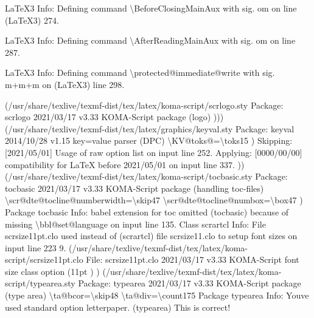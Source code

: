 \documentclass[
  letterpaper,
  DIV=11,
  numbers=noendperiod]{scrartcl}
\newenvironment{Shaded}{\begin{snugshade}}{\end{snugshade}}
\newcommand{\NormalTok}[1]{\textcolor[rgb]{0.00,0.23,0.31}{#1}}
\begin{document}
\begin{Shaded}
\begin{Highlighting}[]
\NormalTok{LaTeX3 Info: Defining command \textbackslash{}BeforeClosingMainAux with sig. \textquotesingle{}om\textquotesingle{} on line}
\NormalTok{(LaTeX3)     274.}


\NormalTok{LaTeX3 Info: Defining command \textbackslash{}AfterReadingMainAux with sig. \textquotesingle{}om\textquotesingle{} on line 287.}


\NormalTok{LaTeX3 Info: Defining command \textbackslash{}protected@immediate@write with sig. \textquotesingle{}m+m+m\textquotesingle{} on}
\NormalTok{(LaTeX3)     line 298.}

\NormalTok{(/usr/share/texlive/texmf{-}dist/tex/latex/koma{-}script/scrlogo.sty}
\NormalTok{Package: scrlogo 2021/03/17 v3.33 KOMA{-}Script package (logo)}
\NormalTok{))) (/usr/share/texlive/texmf{-}dist/tex/latex/graphics/keyval.sty}
\NormalTok{Package: keyval 2014/10/28 v1.15 key=value parser (DPC)}
\NormalTok{\textbackslash{}KV@toks@=\textbackslash{}toks15}
\NormalTok{)}
\NormalTok{Skipping: [2021/05/01] Usage of raw option list on input line 252.}
\NormalTok{Applying: [0000/00/00] compatibility for LaTeX before 2021/05/01 on input line }
\NormalTok{337.}
\NormalTok{)) (/usr/share/texlive/texmf{-}dist/tex/latex/koma{-}script/tocbasic.sty}
\NormalTok{Package: tocbasic 2021/03/17 v3.33 KOMA{-}Script package (handling toc{-}files)}
\NormalTok{\textbackslash{}scr@dte@tocline@numberwidth=\textbackslash{}skip47}
\NormalTok{\textbackslash{}scr@dte@tocline@numbox=\textbackslash{}box47}
\NormalTok{)}
\NormalTok{Package tocbasic Info: babel extension for \textasciigrave{}toc\textquotesingle{} omitted}
\NormalTok{(tocbasic)             because of missing \textbackslash{}bbl@set@language on input line 135.}
\NormalTok{Class scrartcl Info: File \textasciigrave{}scrsize11pt.clo\textquotesingle{} used instead of}
\NormalTok{(scrartcl)           file \textasciigrave{}scrsize11.clo\textquotesingle{} to setup font sizes on input line 223}
\NormalTok{9.}
\NormalTok{(/usr/share/texlive/texmf{-}dist/tex/latex/koma{-}script/scrsize11pt.clo}
\NormalTok{File: scrsize11pt.clo 2021/03/17 v3.33 KOMA{-}Script font size class option (11pt}
\NormalTok{)}
\NormalTok{) (/usr/share/texlive/texmf{-}dist/tex/latex/koma{-}script/typearea.sty}
\NormalTok{Package: typearea 2021/03/17 v3.33 KOMA{-}Script package (type area)}
\NormalTok{\textbackslash{}ta@bcor=\textbackslash{}skip48}
\NormalTok{\textbackslash{}ta@div=\textbackslash{}count175}
\NormalTok{Package typearea Info: You\textquotesingle{}ve used standard option \textasciigrave{}letterpaper\textquotesingle{}.}
\NormalTok{(typearea)             This is correct!}

\end{Highlighting}
\end{Shaded}
\end{document}
